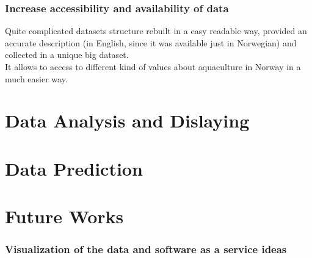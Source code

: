 \section{Increase accessibility and availability of data}
Quite complicated datasets structure rebuilt in a easy readable way, provided an accurate description (in English, since it was available just in Norwegian) and collected in a unique big dataset. \\
It allows to access to different kind of values about aquaculture in Norway in a much easier way.



\part{Data Analysis and Dislaying}


\part{Data Prediction}


\part{Future Works}
\section{Visualization of the data and software as a service ideas}










